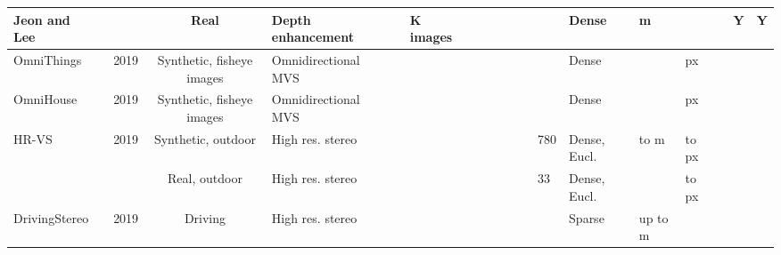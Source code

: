 \documentclass[10pt,journal,compsoc]{IEEEtran}
\begin{document}
\begin{table*}[t]
{\begin{tabular}{@{}p{8.5em}@{ }c@{ } c@{ }p{11.915em}c@{ }p{7.5em}@{ }p{5.335em}@{ }p{5.5em}c@{ }c@{ }l@{ }p{8.665em}lll @{ }l  @{ }l@{ }l@{}}
     \hline
  
  Jeon and Lee~\cite{Jeon_2018_ECCV}  &  &  \multicolumn{1}{p{7em}}{Real} &  \multicolumn{1}{p{7em}}{Depth enhancement} &    &  \multicolumn{1}{p{7.5em}}{K images} &  \multicolumn{1}{l}{} & \multicolumn{1}{l}{} &   & & \multicolumn{1}{l}{}  &  & Dense & m  &  & &  \multicolumn{1}{l}{Y} &  \multicolumn{1}{l}{Y} \\
 
 
 
    \hline 
    {OmniThings~\cite{Won_2019_ICCV,Won_2020_PAMI}} & \multicolumn{1}{c}{2019} & \multicolumn{1}{p{7em}}{Synthetic, fisheye images} & \multicolumn{1}{p{11.915em}}{Omnidirectional MVS} &  & \multicolumn{1}{p{7.5em}}{} & \multicolumn{1}{p{5.335em}}{} & \multicolumn{1}{p{5.585em}}{} & \multicolumn{1}{c}{} & & \multicolumn{1}{l}{} & \multicolumn{1}{l}{} & Dense &  & px & &  \multicolumn{1}{r}{} & \multicolumn{1}{r}{} \\
    \hline
  
   {OmniHouse~\cite{Won_2019_ICCV,Won_2020_PAMI}} & \multicolumn{1}{c}{2019} & \multicolumn{1}{p{7em}}{Synthetic, fisheye images} & \multicolumn{1}{p{11.915em}}{Omnidirectional MVS} &  & \multicolumn{1}{p{7.5em}}{} & \multicolumn{1}{p{5.335em}}{} & \multicolumn{1}{p{5.585em}}{} & \multicolumn{1}{c}{} & & \multicolumn{1}{l}{} & \multicolumn{1}{l}{} & Dense &  & px &  &\multicolumn{1}{r}{} & \multicolumn{1}{r}{} \\
    \hline
  
 
   {HR-VS~\cite{Yang_2019_CVPR}} & \multicolumn{1}{c}{2019} & \multicolumn{1}{p{7em}}{Synthetic, outdoor} & \multicolumn{1}{p{11.915em}}{High res. stereo} & \multicolumn{1}{c}{} & \multicolumn{1}{p{7.5em}}{} & \multicolumn{1}{p{5.335em}}{} & \multicolumn{1}{p{5.585em}}{} & \multicolumn{1}{c}{} & &  \multicolumn{1}{l}{} & \multicolumn{1}{l}{780} & Dense, Eucl. &  to m &  to px &  & \multicolumn{1}{l}{} & \multicolumn{1}{l}{} \\
   \cline{3-18}
  
     &  & \multicolumn{1}{p{7em}}{Real, outdoor} & \multicolumn{1}{p{11.915em}}{High res. stereo} & \multicolumn{1}{c}{} & \multicolumn{1}{l}{} & \multicolumn{1}{p{5.335em}}{} & \multicolumn{1}{l}{} &  \multicolumn{1}{c}{} & &\multicolumn{1}{l}{} & \multicolumn{1}{l}{33} & Dense, Eucl. &       &  to px & & \multicolumn{1}{l}{} & \multicolumn{1}{l}{} \\
    \hline
  
  {DrivingStereo~\cite{yang2019drivingstereo}} & \multicolumn{1}{c}{2019} & \multicolumn{1}{p{7em}}{Driving} & \multicolumn{1}{p{11.915em}}{High res. stereo} & \multicolumn{1}{c}{} & \multicolumn{1}{p{7.5em}}{} & \multicolumn{1}{p{5.335em}}{} & \multicolumn{1}{p{5.585em}}{} & \multicolumn{1}{c}{} & & \multicolumn{1}{l}{} & \multicolumn{1}{l}{} & Sparse & up to m &     &    & \multicolumn{1}{l}{} & \multicolumn{1}{l}{} \\
  

\end{tabular}}
\end{table*}
\end{document}
